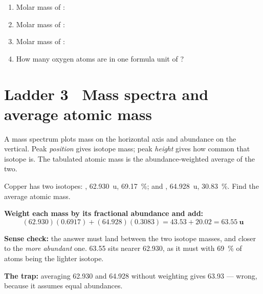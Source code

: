 \documentclass{apchem-worksheet}
\begin{document}
\begin{yourturn}
\begin{enumerate}[leftmargin=*,itemsep=0.5em]
  \item Molar mass of : \workspace[1.4cm]
  \item Molar mass of : \workspace[1.4cm]
  \item Molar mass of : \workspace[1.8cm]
  \item How many oxygen atoms are in one formula unit of
        ? \workspace[1.4cm]
\end{enumerate}
\end{yourturn}

\section*{\sffamily Ladder 3 \textbullet\ Mass spectra and average atomic mass}

A mass spectrum plots mass on the horizontal axis and abundance on the
vertical. Peak \emph{position} gives isotope mass; peak \emph{height}
gives how common that isotope is. The tabulated atomic mass is the
abundance-weighted average of the two.

\begin{workedexample}
Copper has two isotopes: ,
\SI{62.930}{\atomicmassunit}, \SI{69.17}{\percent}; and ,
\SI{64.928}{\atomicmassunit}, \SI{30.83}{\percent}. Find the average
atomic mass.

\textbf{Weight each mass by its fractional abundance and add:}
\[ (62.930)(0.6917) + (64.928)(0.3083) = 43.53 + 20.02 =
   \mathbf{63.55~u} \]

\textbf{Sense check:} the answer must land between the two isotope masses,
and closer to the \emph{more abundant} one. \num{63.55} sits nearer
\num{62.930}, as it must with \SI{69}{\percent} of atoms being the lighter
isotope.

\textbf{The trap:} averaging \num{62.930} and \num{64.928} without
weighting gives \num{63.93} --- wrong, because it assumes equal
abundances.
\end{workedexample}
\end{document}
